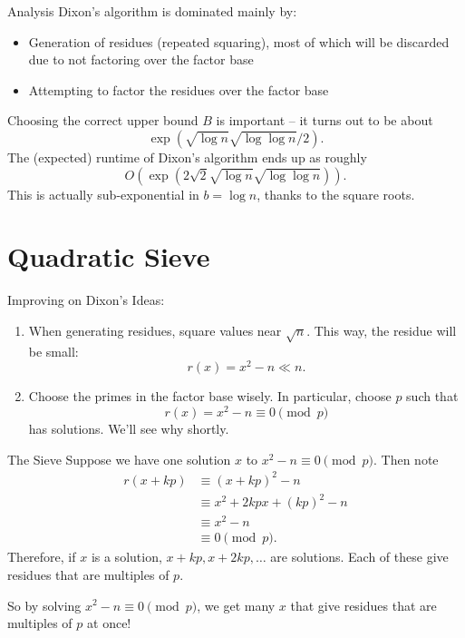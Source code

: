 \documentclass[aspectratio=169]{beamer}
\begin{document}
\begin{frame}{Analysis}
  Dixon's algorithm is dominated mainly by:
  \begin{itemize}
    \item Generation of residues (repeated squaring), most of which will be discarded
    due to not factoring over the factor base
    \item Attempting to factor the residues over the factor base
  \end{itemize} \pause
  Choosing the correct upper bound $B$ is important -- it turns out to be about
  \[\exp\left(\sqrt{\log n} \sqrt{\log \log n} / 2\right).\]
  \pause
  The (expected) runtime of Dixon's algorithm ends up as roughly
  $$O\left(\exp\left(2\sqrt{2} \sqrt{\log n}\sqrt{\log \log n}\right)\right).$$ \pause
  This is actually sub-exponential in $b = \log n$, thanks to the square roots.
\end{frame}

\section{Quadratic Sieve}
\frame{\sectionpage}

\begin{frame}{Improving on Dixon's}
  Ideas:
  \begin{enumerate}
    \item When generating residues, square values near $\sqrt{n}$.
    This way, the residue will be small:
    \[r(x) = x^2 - n \ll n.\] \pause
    \item Choose the primes in the factor base wisely.
    In particular, choose $p$ such that
    $$r(x) = x^2 - n \equiv 0 \pmod{p}$$
    has solutions. We'll see why shortly.
  \end{enumerate}
\end{frame}

\begin{frame}{The Sieve}
  Suppose we have one solution $x$ to $x^2 - n \equiv 0 \pmod{p}$. \pause
  Then note
  \begin{align*}
    r(x + kp) &\equiv (x+kp)^2 - n \\
    &\equiv x^2 + 2kpx + (kp)^2 - n \\
    &\equiv x^2 - n \\
    &\equiv 0 \pmod{p}.
  \end{align*} \pause
  Therefore, if $x$ is a solution, $x+kp, x+2kp, \dots$ are solutions.
  Each of these give residues that are multiples of $p$. \pause

  So by solving $x^2 - n \equiv 0 \pmod{p}$,
  we get many $x$ that give residues that are multiples of $p$ at once!

\end{frame}
\end{document}

